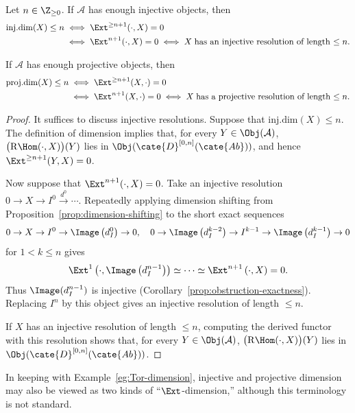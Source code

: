\begin{proposition}\label{prop:id-pd-Ext}
	Let $n\in\Z_{\geq0}$. If $\mathcal{A}$ has enough injective objects, then
	\begin{align*}
		\mathrm{inj.dim}(X) \leq n & \iff \Ext^{\geq n+1}(\cdot, X) = 0 \\
		& \iff \Ext^{n+1}(\cdot, X) = 0 \iff X\;\text{has an injective resolution of length $\leq n$}.
	\end{align*}

	If $\mathcal{A}$ has enough projective objects, then
	\begin{align*}
		\mathrm{proj.dim}(X) \leq n & \iff \Ext^{\geq n+1}(X, \cdot) = 0 \\
		& \iff \Ext^{n+1}(X, \cdot) = 0 \iff X\;\text{has a projective resolution of length $\leq n$}.
	\end{align*}
\end{proposition}
\begin{proof}
	It suffices to discuss injective resolutions. Suppose that
	$\mathrm{inj.dim}(X)\leq n$. The definition of dimension implies that, for
	every $Y\in\Obj(\mathcal{A})$,
	$\bigl(\mathrm{R}\Hom(\cdot,X)\bigr)(Y)$ lies in
	$\Obj(\cate{D}^{[0,n]}(\cate{Ab}))$, and hence
	$\Ext^{\geq n+1}(Y,X)=0$.

	Now suppose that $\Ext^{n+1}(\cdot,X)=0$. Take an injective resolution
	$0\to X\to I^0\xrightarrow{d^0}\cdots$. Repeatedly applying dimension
	shifting from Proposition~\ref{prop:dimension-shifting} to the short exact
	sequences
	\[ 0 \to X \to I^0 \to \Image\left(d_I^0 \right) \to 0, \quad 0 \to \Image\left( d_I^{k-2}\right) \to I^{k-1} \to \Image\left(d_I^{k-1} \right) \to 0 \]
	for $1<k\leq n$ gives
	\[ \Ext^1\left(\cdot, \Image\left(d_I^{n-1}\right) \right) \simeq \cdots \simeq \Ext^{n+1}\left(\cdot, X \right) = 0. \]
	Thus $\Image(d_I^{n-1})$ is injective
	(Corollary~\ref{prop:obstruction-exactness}). Replacing $I^n$ by this object
	gives an injective resolution of length $\leq n$.

	If $X$ has an injective resolution of length $\leq n$, computing the
	derived functor with this resolution shows that, for every
	$Y\in\Obj(\mathcal{A})$,
	$\bigl(\mathrm{R}\Hom(\cdot,X)\bigr)(Y)$ lies in
	$\Obj(\cate{D}^{[0,n]}(\cate{Ab}))$.
\end{proof}

In keeping with Example~\ref{eg:Tor-dimension}, injective and projective
dimension may also be viewed as two kinds of ``$\Ext$-dimension,'' although
this terminology is not standard.

